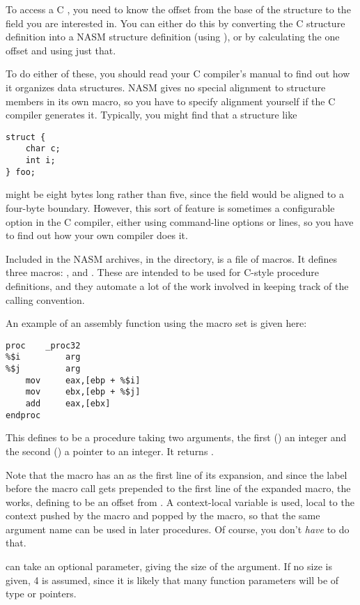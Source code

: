 To access a C , you need to know the offset from
the base of the structure to the field you are interested in. You
can either do this by converting the C structure definition into a
NASM structure definition (using ), or by calculating the
one offset and using just that.

To do either of these, you should read your C compiler's manual to
find out how it organizes data structures. NASM gives no special
alignment to structure members in its own  macro,
so you have to specify alignment yourself if the C compiler generates it.
Typically, you might find that a structure like

\begin{lstlisting}
struct {
    char c;
    int i;
} foo;
\end{lstlisting}

might be eight bytes long rather than five, since the  field
would be aligned to a four-byte boundary. However, this sort of
feature is sometimes a configurable option in the C compiler, either
using command-line options or  lines, so you have to find
out how your own compiler does it.


Included in the NASM archives, in the 
directory, is a file  of macros. It defines three macros:
,  and . These are
intended to be used for C-style procedure definitions, and they automate
a lot of the work involved in keeping track of the calling convention.

An example of an assembly function using the macro set is given
here:

\begin{lstlisting}
proc    _proc32
%$i         arg
%$j         arg
    mov     eax,[ebp + %$i]
    mov     ebx,[ebp + %$j]
    add     eax,[ebx]
endproc
\end{lstlisting}

This defines  to be a procedure taking two arguments, the
first () an integer and the second () a pointer to an
integer. It returns .

Note that the  macro has an  as the first line of its
expansion, and since the label before the macro call gets prepended
to the first line of the expanded macro, the  works, defining
 to be an offset from . A context-local variable is
used, local to the context pushed by the  macro and popped
by the  macro, so that the same argument name can be used
in later procedures. Of course, you don't \emph{have} to do that.

 can take an optional parameter, giving the size of the
argument. If no size is given, 4 is assumed, since it is likely that
many function parameters will be of type  or pointers.
